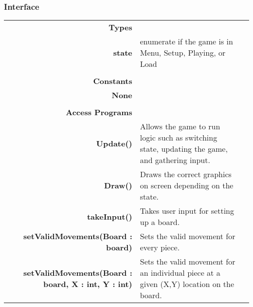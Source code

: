 \documentclass[10pt]{article}
\begin{document}
    \subsubsection{Interface}
        \begin{tabularx}{\linewidth}{@{} >{\bfseries}r Xp{5cm} }
            Types           & \begin{tabular}[t]{@{} l p{8cm}} 
                                     & \\
                                    state & enumerate if the game is in Menu, Setup, Playing, or Load \\
                              \end{tabular} \\
                              
            Constants       & \begin{tabular}[t]{@{} l p{8cm}} 
                                     & \\
                                    None & \\
                              \end{tabular} \\

            Access Programs & \begin{tabular}[t]{@{} l p{8cm}}
                                     & \\
                                    Update() & Allows the game to run logic such as switching state, updating the game, and gathering input. \\
                                    Draw() & Draws the correct graphics on screen depending on the state. \\ 
                                    takeInput() & Takes user input for setting up a board. \\
                                    setValidMovements(Board : board) & Sets the valid movement for every piece. \\
                                    setValidMovements(Board : board, X : int, Y : int) & Sets the valid movement for an individual piece at a given (X,Y) location on the board. 
                              \end{tabular}
        \end{tabularx}
        
\end{document}
